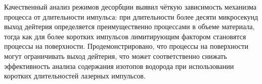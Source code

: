 Качественный анализ режимов десорбции выявил чёткую зависимость механизма процесса от длительности импульса: при длительности более десяти микросекунд выход дейтерия определяется преимущественно процессами в объеме материала, тогда как для более коротких импульсов лимитирующим фактором становятся процессы на поверхности. Продемонстрировано, что процессы на поверхности могут ограничивать выход дейтерия, что может соответственно снижать эффективность анализа содержания изотопов водорода при использовании коротких длительностей лазерных импульсов.


\clearpage
